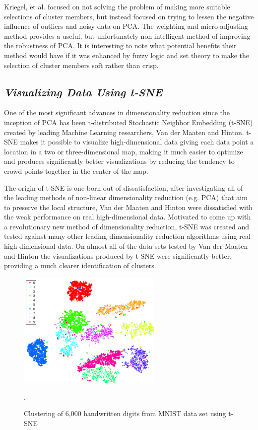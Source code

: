 \documentclass{article}
\begin{document}
Kriegel, et al. focused on not solving the problem of making more suitable selections of cluster members, but instead focused on trying to lessen the negative influence of outliers and noisy data on PCA. The weighting and micro-adjusting method provides a useful, but unfortunately non-intelligent method of improving the robustness of PCA. It is interesting to note what potential benefits their method would have if it was enhanced by fuzzy logic and set theory to make the selection of cluster members soft rather than crisp.


\subsection{\emph{Visualizing Data Using t-SNE}}

One of the most significant advances in dimensionality reduction since the inception of PCA has been t-distributed Stochastic Neighbor Embedding (t-SNE) created by leading Machine Learning researchers, Van der Maaten and Hinton. t-SNE makes it possible to visualize high-dimensional data giving each data point a location in a two or three-dimensional map, making it much easier to optimize and produces significantly better visualizations by reducing the tendency to crowd points together in the center of the map\cite{van2008visualizing}.

The origin of t-SNE is one born out of dissatisfaction, after investigating all of the leading methods of non-linear dimensionality reduction (e.g. PCA) that aim to preserve the local structure, Van der Maaten and Hinton were dissatisfied with the weak performance on real high-dimensional data\cite{van2008visualizing}. Motivated to come up with a revolutionary new method of dimensionality reduction, t-SNE was created and tested against many other leading dimensionality reduction algorithms using real high-dimensional data. On almost all of the data sets tested by Van der Maaten and Hinton the visualizations produced by t-SNE were significantly better, providing a much clearer identification of clusters.

\begin{figure}[H]
\centering
\includegraphics[width=0.62\textwidth]{figures/tsne-cluster}
\caption{Clustering of 6,000 handwritten digits from MNIST data set using t-SNE\cite{van2008visualizing}}.
\label{fig:tsne-cluster}
\end{figure}
\end{document}
